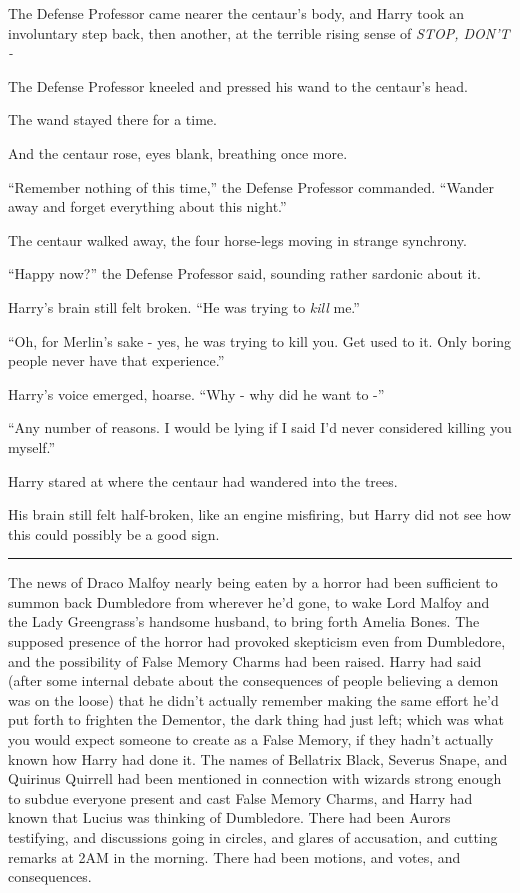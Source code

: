 The Defense Professor came nearer the centaur's body, and Harry took an
involuntary step back, then another, at the terrible rising sense of
\emph{STOP, DON'T -}

The Defense Professor kneeled and pressed his wand to the centaur's
head.

The wand stayed there for a time.

And the centaur rose, eyes blank, breathing once more.

``Remember nothing of this time,'' the Defense Professor commanded.
``Wander away and forget everything about this night.''

The centaur walked away, the four horse-legs moving in strange
synchrony.

``Happy now?'' the Defense Professor said, sounding rather sardonic
about it.

Harry's brain still felt broken. ``He was trying to \emph{kill} me.''

``Oh, for Merlin's sake - yes, he was trying to kill you. Get used to
it. Only boring people never have that experience.''

Harry's voice emerged, hoarse. ``Why - why did he want to -''

``Any number of reasons. I would be lying if I said I'd never considered
killing you myself.''

Harry stared at where the centaur had wandered into the trees.

His brain still felt half-broken, like an engine misfiring, but Harry
did not see how this could possibly be a good sign.

\begin{center}\rule{3in}{0.4pt}\end{center}

The news of Draco Malfoy nearly being eaten by a horror had been
sufficient to summon back Dumbledore from wherever he'd gone, to wake
Lord Malfoy and the Lady Greengrass's handsome husband, to bring forth
Amelia Bones. The supposed presence of the horror had provoked
skepticism even from Dumbledore, and the possibility of False Memory
Charms had been raised. Harry had said (after some internal debate about
the consequences of people believing a demon was on the loose) that he
didn't actually remember making the same effort he'd put forth to
frighten the Dementor, the dark thing had just left; which was what you
would expect someone to create as a False Memory, if they hadn't
actually known how Harry had done it. The names of Bellatrix Black,
Severus Snape, and Quirinus Quirrell had been mentioned in connection
with wizards strong enough to subdue everyone present and cast False
Memory Charms, and Harry had known that Lucius was thinking of
Dumbledore. There had been Aurors testifying, and discussions going in
circles, and glares of accusation, and cutting remarks at 2AM in the
morning. There had been motions, and votes, and consequences.

